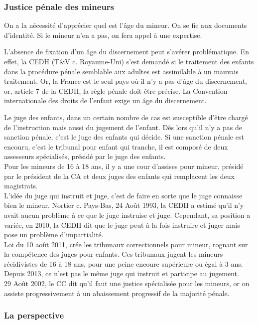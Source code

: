 \documentclass[10pt, a4paper, openany]{book}
\begin{document}
\subsubsection{Justice pénale des mineurs}

On a la nécessité d'apprécier quel est l'âge du mineur. On se fie aux documents d'identité. Si le mineur n'en a pas, on fera appel à une expertise. 


L'absence de fixation d'un âge du discernement peut s'avérer problématique. En effet, la CEDH (T\&V c. Royaume-Uni) s'est demandé si le traitement des enfants dans la procédure pénale semblable aux adultes est assimilable à un mauvais traitement. Or, la France est le seul pays où il n'y a pas d'âge du discernement, or, article 7 de la CEDH, la règle pénale doit être précise. La Convention internationale des droits de l'enfant exige un âge du discernement. 


Le juge des enfants, dans un certain nombre de cas est susceptible d'être chargé de l'instruction mais aussi du jugement de l'enfant. Dès lors qu'il n'y a pas de sanction pénale, c'est le juge des enfants qui décide. Si une sanction pénale est encouru, c'est le tribunal pour enfant qui tranche, il est composé de deux assesseurs spécialisés, présidé par le juge des enfants. \\
Pour les mineurs de 16 à 18 ans, il y a une cour d'assises pour mineur, présidé par le président de la CA et deux juges des enfants qui remplacent les deux magistrats. \\
L'idée du juge qui instruit et juge, c'est de faire en sorte que le juge connaisse bien le mineur. Nortier c. Pays-Bas, 24 Août 1993, la CEDH a estimé qu'il n'y avait aucun problème à ce que le juge instruise et juge. Cependant, sa position a variée, en 2010, la CEDH dit que le juge peut à la fois instruire et juger mais pose un problème d'impartialité. \\
Loi du 10 août 2011, crée les tribunaux correctionnels pour mineur, rognant sur la compétence des juges pour enfants. Ces tribunaux jugent les mineurs récidivistes de 16 à 18 ans, pour une peine encoure supérieure ou égal à 3 ans. Depuis 2013, ce n'est pas le même juge qui instruit et participe au jugement. \\
29 Août 2002, le CC dit qu'il faut une justice spécialisée pour les mineurs, or on assiste progressivement à un abaissement progressif de la majorité pénale. 


\subsubsection{La perspective}
\end{document}
